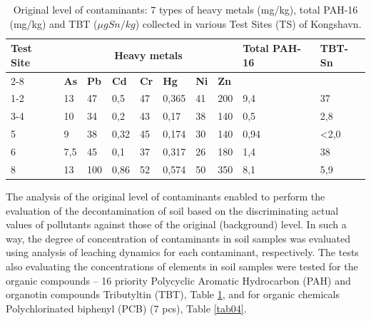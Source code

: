 \documentclass[algorithms,article,submit,pdftex,moreauthors]{Definitions/mdpi}
\begin{document}
\begin{table}[H] 
\setcellgapes{1pt}
\makegapedcells
\caption{Original level of contaminants: 7 types of heavy metals (mg/kg), total PAH-16 (mg/kg) and TBT ($\mu g Sn/kg$) collected in various Test Sites (TS) of Kongshavn.\label{tab03}}
\begin{tabularx}{\textwidth}{p{1.2cm} p{0.8cm} p{0.8cm} p{0.8cm}p{0.8cm}p{0.8cm}p{0.8cm}p{0.8cm}p{2.0cm}p{1.2cm}}
\toprule
\multirow{2}{*}{\textbf{Test Site}} & \multicolumn{7}{c}{\textbf{Heavy metals}} & \multirow{2}{*}{\textbf{Total PAH-16}} & \multirow{2}{*}{\textbf{TBT-Sn}}\\ \cline{2-8}
& \textbf{As} & \textbf{Pb} & \textbf{Cd} & \textbf{Cr} & \textbf{Hg} & \textbf{Ni} & \textbf{Zn} & & \\
\midrule
	1-2 	& 13	& 47 & 0,5 & 47 & 0,365 & 41 & 200 & 9,4 & 37 \\
	3-4 & 10	& 34 & 0,2 & 43 & 0,17 & 38 & 140 & 0,5 & 2,8 \\
	5 &    9	& 38 & 0,32 & 45 & 0,174 & 30 & 140 & 0,94 & <2,0 \\
	6 &   7,5	& 45 & 0,1 & 37 & 0,317 & 26 & 180 & 1,4 & 38 \\
	8 &   13	& 100 & 0,86 & 52 & 0,574 & 50 & 350 & 8,1 & 5,9 \\
\bottomrule
\end{tabularx}
\end{table}

The analysis of the original level of contaminants enabled to perform the evaluation of the decontamination of soil based on the discriminating actual values of pollutants against those of the original (background) level. In such a way, the degree of concentration of contaminants in soil samples was evaluated using analysis of leaching dynamics for each contaminant, respectively. The tests also evaluating the concentrations of elements in soil samples were tested for the organic compounds -- 16 priority Polycyclic Aromatic Hydrocarbon (PAH) and organotin compounds Tributyltin (TBT), Table \ref{tab03}, and for organic chemicals Polychlorinated biphenyl (PCB) (7 pcs), Table \ref{tab04}.
\end{document}
